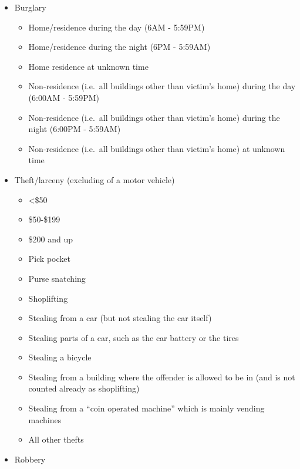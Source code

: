 \documentclass[
]{krantz}
\providecommand{\tightlist}{%
  \setlength{\itemsep}{0pt}\setlength{\parskip}{0pt}}
\begin{document}
\begin{itemize}
\tightlist
\item
  Burglary

  \begin{itemize}
  \tightlist
  \item
    Home/residence during the day (6AM - 5:59PM)
  \item
    Home/residence during the night (6PM - 5:59AM)
  \item
    Home residence at unknown time
  \item
    Non-residence (i.e.~all buildings other than victim's
    home) during the day (6:00AM - 5:59PM)
  \item
    Non-residence (i.e.~all buildings other than victim's
    home) during the night (6:00PM - 5:59AM)
  \item
    Non-residence (i.e.~all buildings other than victim's
    home) at unknown time
  \end{itemize}
\item
  Theft/larceny (excluding of a motor vehicle)

  \begin{itemize}
  \tightlist
  \item
    \textless\$50
  \item
    \$50-\$199
  \item
    \$200 and up
  \item
    Pick pocket
  \item
    Purse snatching
  \item
    Shoplifting
  \item
    Stealing from a car (but not stealing the car itself)
  \item
    Stealing parts of a car, such as the car battery or the
    tires
  \item
    Stealing a bicycle
  \item
    Stealing from a building where the offender is allowed
    to be in (and is not counted already as shoplifting)
  \item
    Stealing from a ``coin operated machine'' which is
    mainly vending machines
  \item
    All other thefts
  \end{itemize}
\item
  Robbery


\end{itemize}
\end{document}
